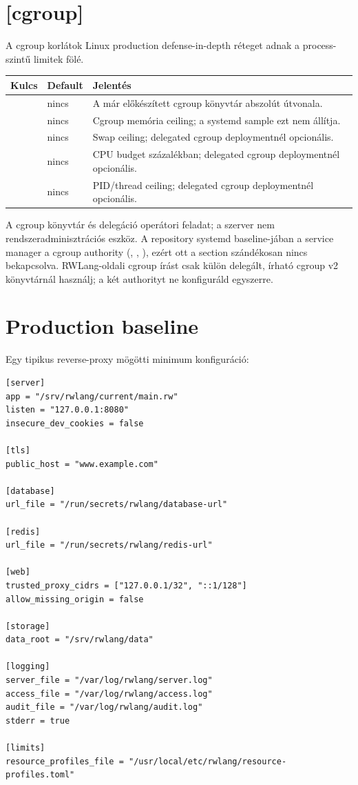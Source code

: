 \section{[cgroup]}

A cgroup korlátok Linux production defense-in-depth réteget adnak a process-szintű limitek fölé.

\begin{longtable}{L{0.34\textwidth}L{0.18\textwidth}L{0.38\textwidth}}
\toprule
Kulcs & Default & Jelentés \\
\midrule
{} & nincs & A már előkészített cgroup könyvtár abszolút útvonala. \\
 & nincs & Cgroup memória ceiling; a systemd sample ezt nem állítja. \\
 & nincs & Swap ceiling; delegated cgroup deploymentnél opcionális. \\
 & nincs & CPU budget százalékban; delegated cgroup deploymentnél opcionális. \\
 & nincs & PID/thread ceiling; delegated cgroup deploymentnél opcionális. \\
\bottomrule
\end{longtable}

A cgroup könyvtár és delegáció operátori feladat; a szerver nem rendszeradminisztrációs eszköz. A repository systemd baseline-jában a service manager a cgroup authority (, , ), ezért ott a \code{[cgroup]} section szándékosan nincs bekapcsolva. RWLang-oldali cgroup írást csak külön delegált, írható cgroup v2 könyvtárnál használj; a két authorityt ne konfiguráld egyszerre.

\section{Production baseline}

Egy tipikus reverse-proxy mögötti minimum konfiguráció:

\begin{lstlisting}
[server]
app = "/srv/rwlang/current/main.rw"
listen = "127.0.0.1:8080"
insecure_dev_cookies = false

[tls]
public_host = "www.example.com"

[database]
url_file = "/run/secrets/rwlang/database-url"

[redis]
url_file = "/run/secrets/rwlang/redis-url"

[web]
trusted_proxy_cidrs = ["127.0.0.1/32", "::1/128"]
allow_missing_origin = false

[storage]
data_root = "/srv/rwlang/data"

[logging]
server_file = "/var/log/rwlang/server.log"
access_file = "/var/log/rwlang/access.log"
audit_file = "/var/log/rwlang/audit.log"
stderr = true

[limits]
resource_profiles_file = "/usr/local/etc/rwlang/resource-profiles.toml"
\end{lstlisting}

